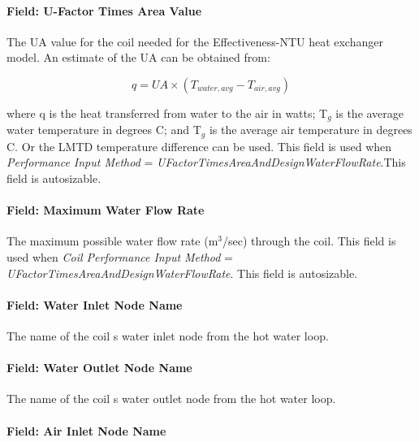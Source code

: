 \paragraph{Field: U-Factor Times Area Value}\label{field-u-factor-times-area-value}

The UA value for the coil needed for the Effectiveness-NTU heat exchanger model. An estimate of the UA can be obtained from:

\begin{equation}
q = UA \times ({T_{water,avg}} - {T_{air,avg}})
\end{equation}

where q is the heat transferred from water to the air in watts; T\(_{g}\) is the average water temperature in degrees C; and T\(_{g}\) is the average air temperature in degrees C. Or the LMTD temperature difference can be used. This field is used when \emph{Performance Input Method} = \emph{UFactorTimesAreaAndDesignWaterFlowRate}.This field is autosizable.

\paragraph{Field: Maximum Water Flow Rate}\label{field-maximum-water-flow-rate-000}

The maximum possible water flow rate (m\(^{3}\)/sec) through the coil. This field is used when \emph{Coil Performance Input Method} = \emph{UFactorTimesAreaAndDesignWaterFlowRate}. This field is autosizable.

\paragraph{Field: Water Inlet Node Name}\label{field-water-inlet-node-name-1-000}

The name of the coil s water inlet node from the hot water loop.

\paragraph{Field: Water Outlet Node Name}\label{field-water-outlet-node-name-1-000}

The name of the coil s water outlet node from the hot water loop.

\paragraph{Field: Air Inlet Node Name}\label{field-air-inlet-node-name-1-003}

